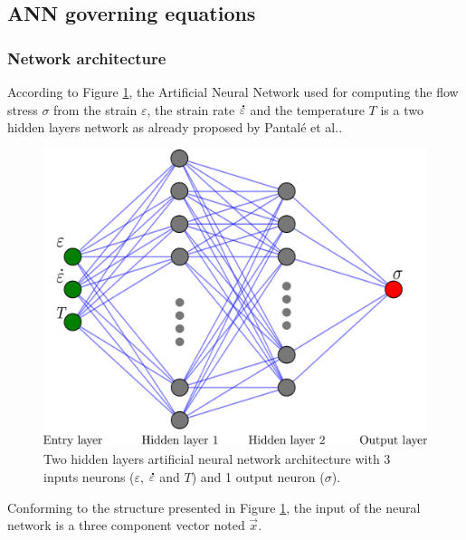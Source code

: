 \documentclass[algorithms,article,submit,pdftex,moreauthors]{Definitions/mdpi}
\makeatletter
\DeclareRobustCommand{\mdot}[1]{\accentset{\mbox{\bfseries .}}{#1}}
\DeclareRobustCommand{\eal}{et al.\@\xspace}
\makeatother
\begin{document}
\subsection{ANN governing equations\label{subsec:ANN-eqn}}

\subsubsection{Network architecture\label{subsubsec:ANN-arch}}
According to Figure \ref{fig:ANN-2HL}, the Artificial Neural Network used for computing the flow stress $\sigma$ from the strain $\varepsilon$, the strain rate $\mdot{\varepsilon}$ and the temperature $T$ is a two hidden layers network as already proposed by Pantalé \eal \cite{Pantale-2021-EIN, Pantale-2023-DIA}.
\begin{figure}[h]
\centering
\includegraphics[width=0.55\columnwidth]{Figures/ANN-2HL}
\caption{Two hidden layers artificial neural network architecture with 3 inputs neurons ($\varepsilon$, $\mdot{\varepsilon}$ and $T$) and 1 output neuron ($\sigma$).}
\label{fig:ANN-2HL}
\end{figure}
Conforming to the structure presented in Figure \ref{fig:ANN-2HL}, the input of the neural network is a three component vector noted $\overrightarrow{x}$.
\end{document}
